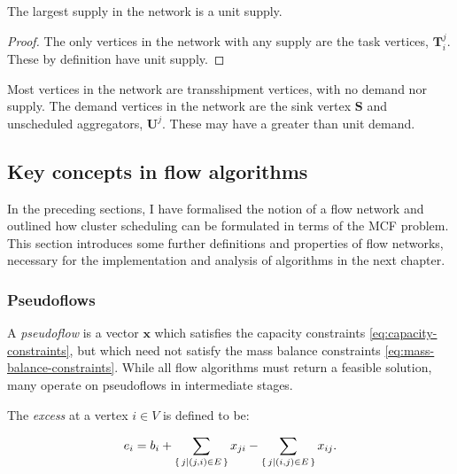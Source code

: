 \begin{lemma} \label{lemma:network-supply}
The largest supply in the network is a unit supply.
\end{lemma}
\begin{proof}
The only vertices in the network with any supply are the task vertices, $\mathbf{T}_i^j$. These by definition have unit supply.
\end{proof}

\begin{remark}
Most vertices in the network are transshipment vertices, with no demand nor supply. The demand vertices in the network are the sink vertex $\mathbf{S}$ and unscheduled aggregators, $\mathbf{U}^j$. These may have a greater than unit demand.
\end{remark}

\subsection{Key concepts in flow algorithms}


In the preceding sections, I have formalised the notion of a flow network and outlined how cluster scheduling can be formulated in terms of the MCF problem. This section introduces some further definitions and properties of flow networks, necessary for the implementation and analysis of algorithms in the next chapter.

\subsubsection{Pseudoflows} \label{sec:prep-flow-pseudo}


A \emph{pseudoflow} is a vector $\mathbf{x}$ which satisfies the capacity constraints
\cref{eq:capacity-constraints}, but which need not satisfy the mass balance constraints \cref{eq:mass-balance-constraints}. While all flow algorithms must return a feasible solution, many operate on pseudoflows in intermediate stages. 

The \emph{excess} at a vertex $i\in V$ is defined to be:

\begin{equation}
e_i=b_i+\sum_{\set{j | (j,i)\in E}}x_{ji}-\sum_{\set{j | (i,j)\in E}}x_{ij}.
\end{equation}

